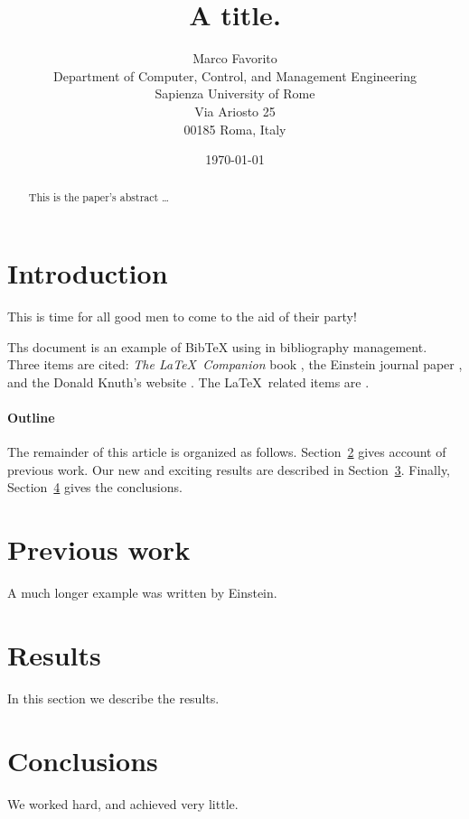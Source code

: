\documentclass[12pt]{article}
\title{A title. \LaTeXe{}}
\author{
        Marco Favorito \\
                Department of Computer, Control, and Management Engineering\\
                Sapienza University of Rome\\
                Via Ariosto 25\\ 
                00185 Roma, Italy 
}
\date{\today}
\begin{document}

\maketitle

\begin{abstract}
This is the paper's abstract \ldots
\end{abstract}

\section{Introduction}
This is time for all good men to come to the aid of their party!

Ths document is an example of BibTeX using in bibliography management. Three items 
are cited: \textit{The \LaTeX\ Companion} book \cite{latexcompanion}, the Einstein
journal paper \cite{einstein}, and the Donald Knuth's website \cite{knuthwebsite}. 
The \LaTeX\ related items are \cite{latexcompanion,knuthwebsite}. 
 
\paragraph{Outline}
The remainder of this article is organized as follows.
Section~\ref{previous work} gives account of previous work.
Our new and exciting results are described in Section~\ref{results}.
Finally, Section~\ref{conclusions} gives the conclusions.

\section{Previous work}\label{previous work}
A much longer \LaTeXe{} example was written by Einstein\cite{einstein}.

\section{Results}\label{results}
In this section we describe the results.

\section{Conclusions}\label{conclusions}
We worked hard, and achieved very little.

\printbibliography
\end{document}
